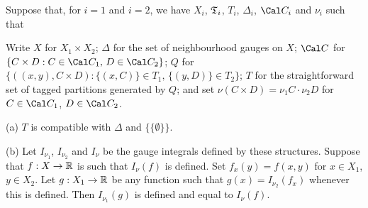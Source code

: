  Suppose that, for $i=1$ and $i=2$, we
have $X_i$, $\frak T_i$, $T_i$, $\Delta_i$, $\Cal C_i$ and $\nu_i$
such
that


\noindent Write $X$ for $X_1\times X_2$;  $\Delta$ for the set of
neighbourhood gauges on $X$;  $\Cal C$ for
$\{C\times D:C\in\Cal C_1,\,D\in\Cal C_2\}$;  $Q$ for
$\{((x,y),C\times D):\{(x,C)\}\in T_1,\,\{(y,D)\}\in T_2\}$;
$T$ for the straightforward set of tagged partitions generated by $Q$;
and set
$\nu(C\times D)=\nu_1C\cdot\nu_2D$ for $C\in\Cal C_1$, $D\in\Cal C_2$.

(a) $T$ is compatible with $\Delta$ and $\{\{\emptyset\}\}$.

(b) Let $I_{\nu_1}$, $I_{\nu_2}$ and $I_{\nu}$ be the gauge integrals
defined by these structures.   Suppose that
$f:X\to\Bbb R$ is such that $I_{\nu}(f)$ is defined.   Set
$f_x(y)=f(x,y)$ for $x\in X_1$, $y\in X_2$.   Let $g:X_1\to\Bbb R$ be
any function such that $g(x)=I_{\nu_2}(f_x)$ whenever this is defined.
Then $I_{\nu_1}(g)$ is defined and equal to $I_{\nu}(f)$.

